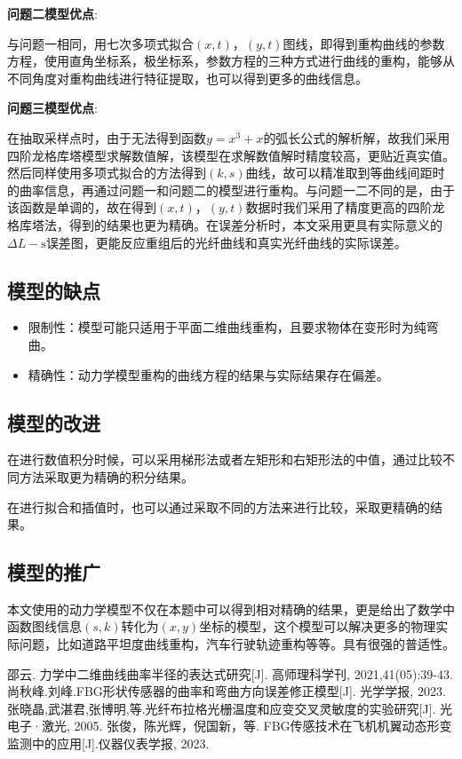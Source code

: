 \documentclass[withoutpreface,bwprint]{cumcmthesis}
\begin{document}
\textbf{问题二模型优点}:

与问题一相同，用七次多项式拟合$(x,t)$，$(y,t)$图线，即得到重构曲线的参数方程，使用直角坐标系，极坐标系，参数方程的三种方式进行曲线的重构，能够从不同角度对重构曲线进行特征提取，也可以得到更多的曲线信息。

\textbf{问题三模型优点}:

在抽取采样点时，由于无法得到函数$y=x^3+x$的弧长公式的解析解，故我们采用四阶龙格库塔模型求解数值解，该模型在求解数值解时精度较高，更贴近真实值。然后同样使用多项式拟合的方法得到$(k,s)$曲线，故可以精准取到等曲线间距时的曲率信息，再通过问题一和问题二的模型进行重构。与问题一二不同的是，由于该函数是单调的，故在得到$(x,t)$，$(y,t)$数据时我们采用了精度更高的四阶龙格库塔法，得到的结果也更为精确。在误差分析时，本文采用更具有实际意义的$\Delta L-\mathrm{s}$误差图，更能反应重组后的光纤曲线和真实光纤曲线的实际误差。

\subsection{模型的缺点}
\begin{itemize}
\item 限制性：模型可能只适用于平面二维曲线重构，且要求物体在变形时为纯弯曲。
\item 精确性：动力学模型重构的曲线方程的结果与实际结果存在偏差。
\end{itemize}

\subsection{模型的改进}
在进行数值积分时候，可以采用梯形法或者左矩形和右矩形法的中值，通过比较不同方法采取更为精确的积分结果。

在进行拟合和插值时，也可以通过采取不同的方法来进行比较，采取更精确的结果。
\subsection{模型的推广}
本文使用的动力学模型不仅在本题中可以得到相对精确的结果，更是给出了数学中函数图线信息$(s,k)$转化为$(x,y)$坐标的模型，这个模型可以解决更多的物理实际问题，比如道路平坦度曲线重构，汽车行驶轨迹重构等等。具有很强的普适性。

\vspace{5cm}

\begin{thebibliography}{1.2}%
\setlength{\itemsep}{-2mm}
 邵云. 力学中二维曲线曲率半径的表达式研究[J]. 高师理科学刊, 2021,41(05):39-43.
 尚秋峰.刘峰.FBG形状传感器的曲率和弯曲方向误差修正模型[J]. 光学学报, 2023.
 张晓晶,武湛君,张博明,等.光纤布拉格光栅温度和应变交叉灵敏度的实验研究[J]. 光电子·激光, 2005.
 张俊，陈光辉，倪国新，等. FBG传感技术在飞机机翼动态形变监测中的应用[J].仪器仪表学报, 2023.
\end{thebibliography}
\end{document}
